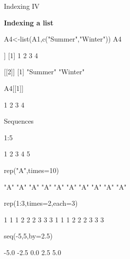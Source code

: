 \documentclass[11pt,german,hideothersubsections]{beamer}
\begin{document}
\begin{frame}[fragile]{Indexing IV}
\begin{center}
\textbf{Indexing a list}
\end{center}
\begin{Schunk}
\begin{Sinput}
 A4<-list(A1,c("Summer","Winter"))
 A4
\end{Sinput}
\begin{Soutput}
[[1]]
[1] 1 2 3 4

[[2]]
[1] "Summer" "Winter"
\end{Soutput}
\begin{Sinput}
 A4[[1]]
\end{Sinput}
\begin{Soutput}
[1] 1 2 3 4
\end{Soutput}
\end{Schunk}
\end{frame}
\begin{frame}[fragile]{Sequences}
\begin{Schunk}
\begin{Sinput}
 1:5
\end{Sinput}
\begin{Soutput}
[1] 1 2 3 4 5
\end{Soutput}
\begin{Sinput}
 rep("A",times=10)
\end{Sinput}
\begin{Soutput}
 [1] "A" "A" "A" "A" "A" "A" "A" "A" "A" "A"
\end{Soutput}
\begin{Sinput}
 rep(1:3,times=2,each=3)
\end{Sinput}
\begin{Soutput}
 [1] 1 1 1 2 2 2 3 3 3 1 1 1 2 2 2 3 3 3
\end{Soutput}
\begin{Sinput}
 seq(-5,5,by=2.5)
\end{Sinput}
\begin{Soutput}
[1] -5.0 -2.5  0.0  2.5  5.0
\end{Soutput}
\end{Schunk}
\end{frame}
\end{document}
